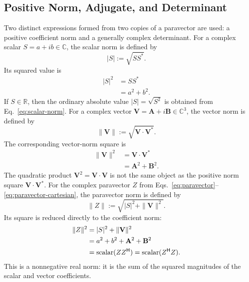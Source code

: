 \documentclass[10pt,letterpaper]{article}
\newcommand{\eqfunc}[1]{\operatorname{#1}}
\newcommand{\R}{\mathbb{R}}
\newcommand{\C}{\mathbb{C}}
\newcommand{\pv}[1]{#1}
\newcommand{\vct}[1]{\mathbf{#1}}
\newcommand{\Hop}{\mathsf H}
\newcommand{\herm}[1]{#1^{\Hop}}
\begin{document}


\subsection{Positive Norm, Adjugate, and Determinant}
Two distinct expressions formed from two copies of a paravector are used: a
positive coefficient norm and a generally complex determinant.
For a complex scalar \(S=a+ib\in\C\), the scalar norm is defined by
\begin{equation}
|S|:=\sqrt{SS^*}.
\label{eq:scalar-norm}
\end{equation}
Its squared value is
\begin{equation*}
\begin{aligned}
|S|^2&=SS^*\\
&=a^2+b^2.
\end{aligned}
\end{equation*}
If \(S\in\R\), then the ordinary absolute value \(|S|=\sqrt{S^2}\) is obtained from Eq.\ \eqref{eq:scalar-norm}.
For a complex vector \(\vct{V}=\vct{A}+i\vct{B}\in\C^3\), the vector norm is defined by
\begin{equation}
\|\vct{V}\|:=\sqrt{\vct{V}\cdot\vct{V}^*}.
\label{eq:vector-norm}
\end{equation}
The corresponding vector-norm square is
\begin{equation*}
\begin{aligned}
\|\vct{V}\|^2&=\vct{V}\cdot\vct{V}^*\\
&=\vct{A}^2+\vct{B}^2.
\end{aligned}
\end{equation*}
The quadratic product \(\vct{V}^2=\vct{V}\cdot\vct{V}\) is not the same object as the positive norm square \(\vct{V}\cdot\vct{V}^*\).
For the complex paravector \(\pv{Z}\) from Eqs.\ \eqref{eq:paravector}--\eqref{eq:paravector-cartesian}, the paravector norm is defined by
\begin{equation}
\|\pv{Z}\|:=\sqrt{|S|^2+\|\vct{V}\|^2}.
\label{eq:euclidean-form}
\end{equation}
Its square is reduced directly to the coefficient norm:
\begin{align}
\|\pv{Z}\|^2
&= |S|^2+\|\vct{V}\|^2\notag\\
&= a^2+b^2+\vct{A}^2+\vct{B}^2\notag\\
&= \eqfunc{scalar}(\pv{Z}\herm{\pv{Z}})
= \eqfunc{scalar}(\herm{\pv{Z}}\pv{Z}).
\label{eq:euclidean-norm-expansion}
\end{align}
This is a nonnegative real norm: it is the sum of the squared magnitudes of the scalar and vector coefficients.
\end{document}

